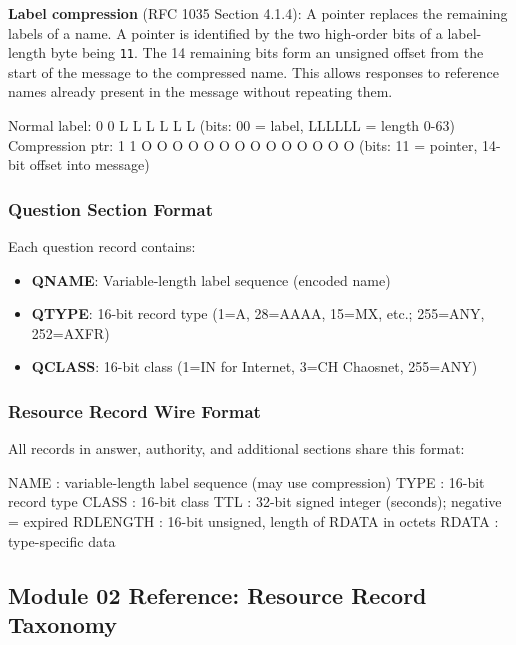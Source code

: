 \documentclass[11pt,letterpaper]{article}
\begin{document}
\textbf{Label compression} (RFC 1035 Section 4.1.4): A pointer replaces the remaining labels of a name. A pointer is identified by the two high-order bits of a label-length byte being \texttt{11}. The 14 remaining bits form an unsigned offset from the start of the message to the compressed name. This allows responses to reference names already present in the message without repeating them.

\begin{asciibox}
Normal label:    0 0 L L L L L L  (bits: 00 = label, LLLLLL = length 0-63)
Compression ptr: 1 1 O O O O O O  O O O O O O O O
                 (bits: 11 = pointer, 14-bit offset into message)
\end{asciibox}

\subsubsection{Question Section Format}

Each question record contains:
\begin{itemize}
  \item \textbf{QNAME}: Variable-length label sequence (encoded name)
  \item \textbf{QTYPE}: 16-bit record type (1=A, 28=AAAA, 15=MX, etc.; 255=ANY, 252=AXFR)
  \item \textbf{QCLASS}: 16-bit class (1=IN for Internet, 3=CH Chaosnet, 255=ANY)
\end{itemize}

\subsubsection{Resource Record Wire Format}

All records in answer, authority, and additional sections share this format:

\begin{asciibox}
NAME      : variable-length label sequence (may use compression)
TYPE      : 16-bit record type
CLASS     : 16-bit class
TTL       : 32-bit signed integer (seconds); negative = expired
RDLENGTH  : 16-bit unsigned, length of RDATA in octets
RDATA     : type-specific data
\end{asciibox}

\subsection{Module 02 Reference: Resource Record Taxonomy}
\end{document}
